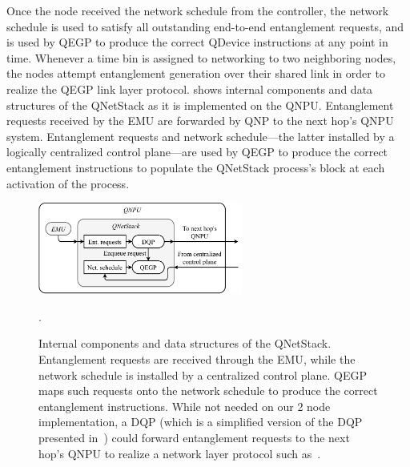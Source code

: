 Once the node received the network schedule from the controller, the network schedule is used to satisfy all outstanding end-to-end entanglement requests, and is used by \ac{QEGP} to produce the correct \ac{QDevice} instructions at any point in time. Whenever a time bin is assigned to networking to two neighboring nodes, the nodes attempt entanglement generation over their shared link in order to realize the \ac{QEGP} link layer protocol. 
 shows internal components and data structures of the \ac{QNetStack} as it is implemented on the \ac{QNPU}. Entanglement requests received by the \ac{EMU} are forwarded by \ac{QNP} to the next hop's \ac{QNPU} system. Entanglement requests and network schedule---the latter installed by a logically centralized control plane---are used by \ac{QEGP} to produce the correct entanglement instructions to populate the \ac{QNetStack} process's block at each activation of the process.

\begin{figure}
\begin{center}
\includegraphics[width=0.6\textwidth]{figures/qnodeos/supplementary/qnetstack-impl.pdf}
\end{center}
\caption[]{Internal components and data structures of the \acf{QNetStack}. Entanglement requests are received through the \acf{EMU}, while the network schedule is installed by a centralized control plane. 
\acf{QEGP} maps such requests onto the network schedule to produce the correct entanglement instructions. While not needed on our 2 node implementation, a \ac{DQP} (which is a simplified version of the \ac{DQP} presented in~\cite[Section 5.2.1]{dahlberg_2019_egp}) could forward entanglement requests to the next hop's \acf{QNPU} to realize a network layer protocol such as~\cite{kozlowski_2020_qnp}.}.
\label{qnodeos:fig:qnetstack-impl}
\end{figure}

